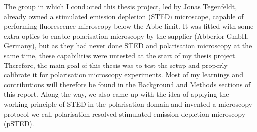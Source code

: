 The group in which I conducted this thesis project, led by Jonas Tegenfeldt, already owned a stimulated emission depletion (STED) microscope, capable of performing fluorescence microscopy below the Abbe limit. It was fitted with some extra optics to enable polarisation microscopy by the supplier (Abberior GmbH, Germany), but as they had never done STED and polarisation microscopy at the same time, these capabilities were untested at the start of my thesis project. Therefore, the main goal of this thesis was to test the setup and properly calibrate it for polarisation microscopy experiments. Most of my learnings and contributions will therefore be found in the Background and Methods sections of this report. Along the way, we also came up with the idea of applying the working principle of STED in the polarisation domain and invented a microscopy protocol we call polarisation-resolved stimulated emission depletion microscopy (pSTED).
